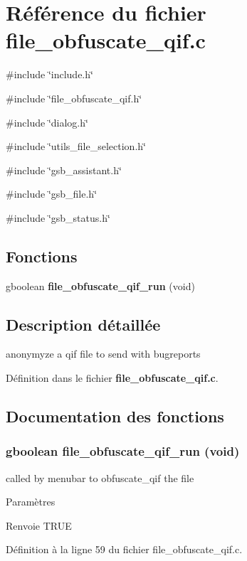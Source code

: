 \section{Référence du fichier file\_\-obfuscate\_\-qif.c}
\label{file__obfuscate__qif_8c}
{\ttfamily \#include \char`\"{}include.h\char`\"{}}\par
{\ttfamily \#include \char`\"{}file\_\-obfuscate\_\-qif.h\char`\"{}}\par
{\ttfamily \#include \char`\"{}dialog.h\char`\"{}}\par
{\ttfamily \#include \char`\"{}utils\_\-file\_\-selection.h\char`\"{}}\par
{\ttfamily \#include \char`\"{}gsb\_\-assistant.h\char`\"{}}\par
{\ttfamily \#include \char`\"{}gsb\_\-file.h\char`\"{}}\par
{\ttfamily \#include \char`\"{}gsb\_\-status.h\char`\"{}}\par
\subsection*{Fonctions}
\begin{DoxyCompactItemize}
\item 
gboolean {\bf file\_\-obfuscate\_\-qif\_\-run} (void)
\end{DoxyCompactItemize}


\subsection{Description détaillée}
anonymyze a qif file to send with bugreports 

Définition dans le fichier {\bf file\_\-obfuscate\_\-qif.c}.



\subsection{Documentation des fonctions}
\subsubsection[{file\_\-obfuscate\_\-qif\_\-run}]{\setlength{\rightskip}{0pt plus 5cm}gboolean file\_\-obfuscate\_\-qif\_\-run (void)}\label{file__obfuscate__qif_8c_a19232ad6d6ddf92d4640c3a897ebba9b}
called by menubar to obfuscate\_\-qif the file


\begin{DoxyParams}{Paramètres}
\item[{\em }]\end{DoxyParams}
\begin{DoxyReturn}{Renvoie}
TRUE 
\end{DoxyReturn}


Définition à la ligne 59 du fichier file\_\-obfuscate\_\-qif.c.


